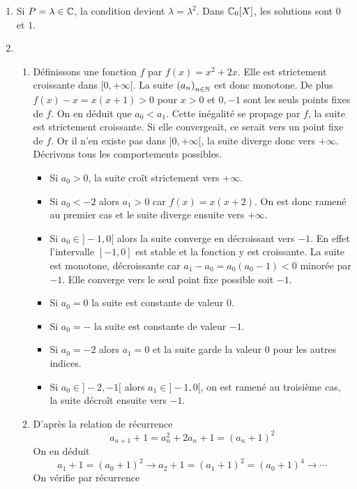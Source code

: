 \begin{enumerate}
 \item Si $P=\lambda\in \mathbb{C}$, la condition devient $\lambda=\lambda^2$. Dans $\mathbb{C}_0[X]$, les solutions sont $0$ et $1$.

 \item 
\begin{enumerate} 
\item Définissons une fonction $f$ par $f(x)=x^2+2x$. Elle est strictement croissante dans $[0,+\infty[$. La suite $\left( a_n\right) _{n\in \mathbb{N}}$ est donc monotone. De plus $f(x)-x=x(x+1)>0$ pour $x>0$ et $0, -1$ sont les seuls points fixes de $f$. On en déduit que $a_0<a_1$. Cette inégalité se propage par $f$, la suite est strictement croissante. Si elle convergeait, ce serait vers un point fixe de $f$. Or il n'en existe pas dans $]0,+\infty[$, la suite diverge donc vers $+\infty$. Décrivons tous les comportements possibles.
\begin{itemize}
 \item Si $a_0>0$, la suite croît strictement vers $+\infty$.
 \item Si $a_0<-2$ alors $a_1>0$ car $f(x)=x(x+2)$. On est donc ramené au premier cas et le suite diverge ensuite vers $+\infty$.
 \item Si $a_0\in]-1,0[$ alors la suite converge en décroissant vers $-1$. En effet l'intervalle $[-1,0]$ est stable et la fonction y est croissante. La suite est monotone, décroissante car $a_1-a_0=a_0(a_0-1)<0$ minorée par $-1$. Elle converge vers le seul point fixe possible soit $-1$.
 \item Si $a_0=0$ la suite est constante de valeur $0$. 
 \item Si $a_0=-$ la suite est constante de valeur $-1$.
 \item Si $a_0=-2$ alors $a_1=0$ et la suite garde la valeur $0$ pour les autres indices.
 \item Si $a_0\in]-2,-1[$ alors $a_1\in]-1,0[$, on est ramené au troisième cas, la suite décroît ensuite vers $-1$.
\end{itemize}
 \item D'après la relation de récurrence
\begin{displaymath}
 a_{n+1}+1=a_n^2+2a_n+1=(a_n+1)^2
\end{displaymath}
On en déduit
\begin{displaymath}
 a_1+1=(a_0+1)^2 \rightarrow a_2+1=(a_1+1)^2=(a_0+1)^4 \rightarrow \cdots
\end{displaymath}
On vérifie par récurrence
\begin{displaymath}

\end{displaymath}
\end{enumerate}
\end{enumerate}

